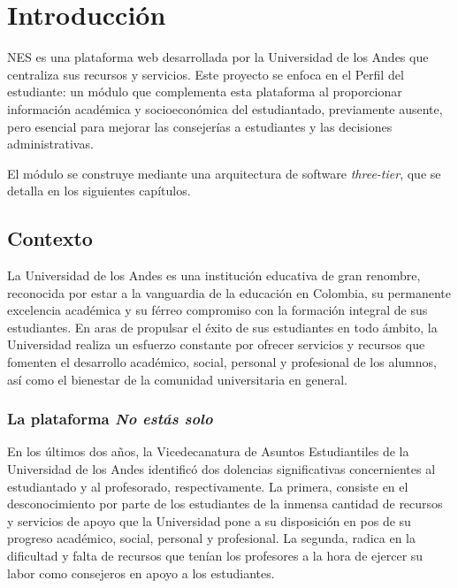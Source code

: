 \chapter{Introducción}

\begin{resumen}
	\gls{NES} es una plataforma web desarrollada por la Universidad de los Andes que centraliza sus recursos y servicios. Este proyecto se enfoca en el Perfil del estudiante: un módulo que complementa esta plataforma al proporcionar información académica y socioeconómica del estudiantado, previamente ausente, pero esencial para mejorar las consejerías a estudiantes y las decisiones administrativas. 
	
	El módulo se construye mediante una arquitectura de software \textit{three-tier}, que se detalla en los siguientes capítulos.
\end{resumen}

\section{Contexto}

La Universidad de los Andes es una institución educativa de gran renombre, reconocida por estar a la vanguardia de la educación en Colombia, su permanente excelencia académica y su férreo compromiso con la formación integral de sus estudiantes. En aras de propulsar el éxito de sus estudiantes en todo ámbito, la Universidad realiza un esfuerzo constante por ofrecer servicios y recursos que fomenten el desarrollo académico, social, personal y profesional de los alumnos, así como el bienestar de la comunidad universitaria en general.

\subsection{La plataforma \textit{No estás solo}}

En los últimos dos años, la Vicedecanatura de Asuntos Estudiantiles de la Universidad de los Andes identificó dos dolencias significativas concernientes al estudiantado y al profesorado, respectivamente. La primera, consiste en el desconocimiento por parte de los estudiantes de la inmensa cantidad de recursos y servicios de apoyo que la Universidad pone a su disposición en pos de su progreso académico, social, personal y profesional. La segunda, radica en la dificultad y falta de recursos que tenían los profesores a la hora de ejercer su labor como consejeros en apoyo a los estudiantes.

